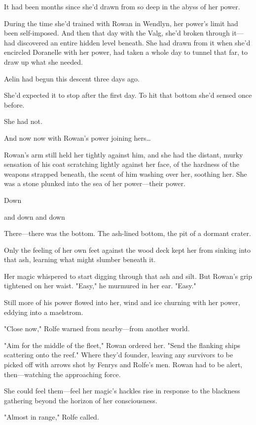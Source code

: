 It had been months since she'd drawn from so deep in the abyss of her power.

During the time she'd trained with Rowan in Wendlyn, her power's limit had been self-imposed. And then that day with the Valg, she'd broken through it--- had discovered an entire hidden level beneath. She had drawn from it when she'd encircled Doranelle with her power, had taken a whole day to tunnel that far, to draw up what she needed.

Aelin had begun this descent three days ago.

She'd expected it to stop after the first day. To hit that bottom she'd sensed once before.

She had not.

And now  now with Rowan's power joining hers\ldots{}

Rowan's arm still held her tightly against him, and she had the distant, murky sensation of his coat scratching lightly against her face, of the hardness of the weapons strapped beneath, the scent of him washing over her, soothing her. She was a stone plunked into the sea of her power---their power.

Down

and down and down

There---there was the bottom. The ash-lined bottom, the pit of a dormant crater.

Only the feeling of her own feet against the wood deck kept her from sinking into that ash, learning what might slumber beneath it.

Her magic whispered to start digging through that ash and silt. But Rowan's grip tightened on her waist. "Easy," he murmured in her ear. "Easy."

Still more of his power flowed into her, wind and ice churning with her power, eddying into a maelstrom.

"Close now," Rolfe warned from nearby---from another world.

"Aim for the middle of the fleet," Rowan ordered her. "Send the flanking ships scattering onto the reef." Where they'd founder, leaving any survivors to be picked off with arrows shot by Fenrys and Rolfe's men. Rowan had to be alert, then---watching the approaching force.

She could feel them---feel her magic's hackles rise in response to the blackness gathering beyond the horizon of her consciousness.

"Almost in range," Rolfe called.


